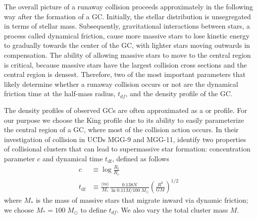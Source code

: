 \documentclass{princeton_astro_thesis}
\newcommand\Msun{\; M_\odot}
\newcommand\msun{\; M_\odot}
\numberwithin{equation}{section}
\begin{document}
The overall picture of a runaway collision proceeds approximately in the following way after the formation of a GC.
Initially, the stellar distribution is unsegregated in terms of stellar mass.
Subsequently, gravitational interactions between stars, a process called dynamical friction, cause more massive stars to lose
kinetic energy to gradually towards the center of the GC, with lighter stars moving outwards in compensation.
The ability of allowing massive stars to move to the central region is critical, because
massive stars have the largest collision cross sections and the central region is densest.
Therefore, two of the most important parameters that likely determine whether
a runaway collision occurs or not 
are the dynamical friction time at the half-mass radius, $t_{df}$, and the density profile of the GC.

The density profiles of observed GCs are often approximated as 
a \citet[][]{1911Plummer} or \citet[][]{1962King} profile.
For our purpose we choose the King profile due to its ability to easily parameterize
the central region of a GC, where most of the collision action occurs.
In their investigation of collision in 
UCDs MGG-9 and MGG-11, \citet{2004SPZ} identify two properties of collisional clusters that can lead to supermassive star formation: 
concentration parameter $c$ and dynamical time $t_{\mathrm{df}}$, defined as follows
\begin{subequations}
    \begin{align}
    c &\equiv \log{\frac{R_t}{R_c}} \\
    t_{\mathrm{df}} &\equiv \frac{\langle m \rangle}{M_*} \frac{0.138N}{\ln{0.11M/100\Msun}}\left(\frac{R^3}{GM}\right)^{1/2}
    \end{align}
    \label{eqn:tdf}
\end{subequations} 
\noindent
where $M_*$ is the mass of massive stars that migrate inward via dynamic friction;
we choose $M_*=100\msun$ to define $t_{df}$.  We also vary the total cluster mass $M$.
\end{document}
